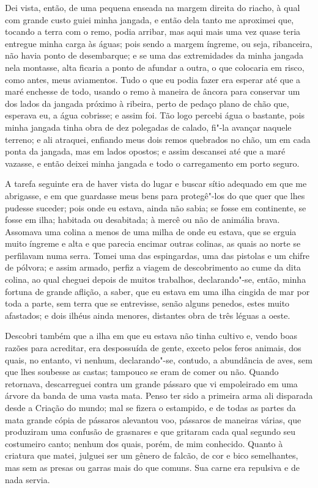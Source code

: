 Dei vista, então, de uma pequena enseada na margem direita do riacho, à
qual com grande custo guiei minha jangada, e então dela tanto me
aproximei que, tocando a terra com o remo, podia arribar, mas aqui mais
uma vez quase teria entregue minha carga às águas; pois sendo a margem
íngreme, ou seja, ribanceira, não havia ponto de desembarque; e se uma
das extremidades da minha jangada nela montasse, alta ficaria a ponto de
afundar a outra, o que colocaria em risco, como antes, meus aviamentos.
Tudo o que eu podia fazer era esperar até que a maré enchesse de todo,
usando o remo à maneira de âncora para conservar um dos lados da jangada
próximo à ribeira, perto de pedaço plano de chão que, esperava eu, a
água cobrisse; e assim foi. Tão logo percebi água o bastante, pois minha
jangada tinha obra de dez polegadas de calado, fi"-la avançar naquele
terreno; e ali atraquei, enfiando meus dois remos quebrados no chão, um
em cada ponta da jangada, mas em lados opostos; e assim descansei até
que a maré vazasse, e então deixei minha jangada e todo o carregamento
em porto seguro.

A tarefa seguinte era de haver vista do lugar e buscar sítio adequado em
que me abrigasse, e em que guardasse meus bens para protegê"-los do que
quer que lhes pudesse suceder; pois onde eu estava, ainda não sabia; se
fosse em continente, se fosse em ilha; habitada ou desabitada; à mercê
ou não de animália brava. Assomava uma colina a menos de uma milha de
onde eu estava, que se erguia muito íngreme e alta e que parecia encimar
outras colinas, as quais ao norte se perfilavam numa serra. Tomei uma
das espingardas, uma das pistolas e um chifre de pólvora; e assim
armado, perfiz a viagem de descobrimento ao cume da dita colina, ao qual
cheguei depois de muitos trabalhos, declarando"-se, então, minha fortuna
de grande aflição, a saber, que eu estava em uma ilha cingida de mar por
toda a parte, sem terra que se entrevisse, senão alguns penedos, estes
muito afastados; e dois ilhéus ainda menores, distantes obra de três
léguas a oeste.

Descobri também que a ilha em que eu estava não tinha cultivo e, vendo
boas razões para acreditar, era despossuída de gente, exceto pelos feros
animais, dos quais, no entanto, vi nenhum, declarando"-se, contudo, a
abundância de aves, sem que lhes soubesse as castas; tampouco se eram de
comer ou não. Quando retornava, descarreguei contra um grande pássaro
que vi empoleirado em uma árvore da banda de uma vasta mata. Penso ter
sido a primeira arma ali disparada desde a Criação do mundo; mal se
fizera o estampido, e de todas as partes da mata grande cópia de
pássaros alevantou voo, pássaros de maneiras várias, que produziram uma
confusão de grasnares e que gritaram cada qual segundo seu costumeiro
canto; nenhum dos quais, porém, de mim conhecido. Quanto à criatura que
matei, julguei ser um gênero de falcão, de cor e bico semelhantes, mas
sem as presas ou garras mais do que comuns. Sua carne era repulsiva e de
nada servia.

